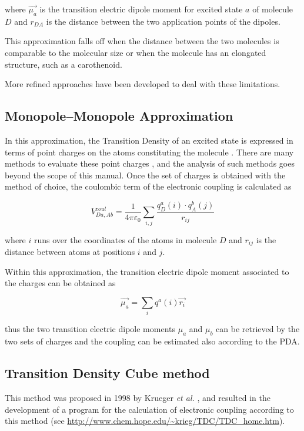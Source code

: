 \documentclass[a4paper]{article}
\begin{document}
where $\vec{\mu_a}$ is the transition electric dipole moment for excited state $a$ of molecule $D$ and $r_{DA}$ is the distance between the two application points of the dipoles.

This approximation falls off when the distance between the two molecules is comparable to the molecular size or when the molecule has an elongated structure, such as a carothenoid.

More refined approaches have been developed to deal with these limitations.

\subsection*{Monopole--Monopole Approximation}
In this approximation, the Transition Density of an excited state is expressed in terms of point charges on the atoms constituting the molecule \cite{Woody1968}. There are many methods to evaluate these point charges \cite{Madjet2006}, and the analysis of such methods goes beyond the scope of this manual. Once the set of charges is obtained with the method of choice, the coulombic term of the electronic coupling is calculated as

\begin{equation}
 V^{coul}_{Da,Ab} = \frac{1}{4\pi\varepsilon_0} \sum_{i,j} \frac{q_D^a(i)\cdot q_A^b(j)}{r_{ij}}
 \label{eq:MMA}
\end{equation}

where $i$ runs over the coordinates of the atoms in molecule $D$ and $r_{ij}$ is the distance between atoms at positions $i$ and $j$.

Within this approximation, the transition electric dipole moment associated to the charges can be obtained as

\begin{equation}
 \vec{\mu_a} = \sum_i q^a(i) \vec{r_i}
 \label{eq:mu_MMA}
\end{equation}

thus the two transition electric dipole moments $\mu_a$ and $\mu_b$ can be retrieved by the two sets of charges and the coupling can be estimated also according to the PDA.

\subsection*{Transition Density Cube method}
This method was proposed in 1998 by Krueger \textit{et al.} \cite{Krueger1998}, and resulted in the development of a program for the calculation of electronic coupling according to this method (see \url{http://www.chem.hope.edu/~krieg/TDC/TDC_home.htm}).
\end{document}
